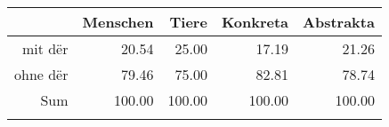 \begin{tabular}{rrrrr}
  \lsptoprule
 & Menschen & Tiere & Konkreta & Abstrakta \\ 
  \midrule
mit dër & 20.54 & 25.00 & 17.19 & 21.26 \\ 
  ohne dër & 79.46 & 75.00 & 82.81 & 78.74 \\ 
  Sum & 100.00 & 100.00 & 100.00 & 100.00 \\ 
   \lspbottomrule
\end{tabular}
